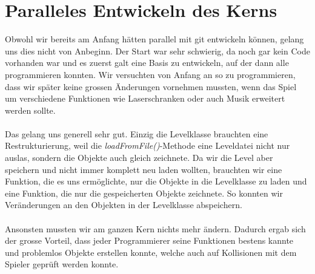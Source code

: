 \documentclass[11pt,a4paper]{scrbook}
\begin{document}
\section{Paralleles Entwickeln des Kerns}
Obwohl wir bereits am Anfang hätten parallel mit git entwickeln können, gelang uns dies nicht von Anbeginn. Der Start war sehr schwierig, da noch gar kein Code vorhanden war
und es zuerst galt eine Basis zu entwickeln, auf der dann alle programmieren konnten. Wir versuchten von Anfang an so zu programmieren,
dass wir später keine grossen Änderungen vornehmen mussten, wenn das Spiel um verschiedene Funktionen wie Laserschranken oder auch Musik erweitert werden sollte.
\\
\\
Das gelang uns generell sehr gut. Einzig die Levelklasse brauchten eine Restrukturierung, weil die \textit{loadFromFile()}-Methode eine Leveldatei nicht nur auslas,
sondern die Objekte auch gleich zeichnete. Da wir die Level aber speichern und nicht immer komplett neu laden wollten, brauchten wir eine
Funktion, die es uns ermöglichte, nur die Objekte in die Levelklasse zu laden und eine Funktion, die nur die gespeicherten Objekte zeichnete. So konnten wir Veränderungen an den Objekten in der Levelklasse abspeichern.
\\
\\
Ansonsten mussten wir am ganzen Kern nichts mehr ändern. Dadurch ergab sich der grosse Vorteil, dass jeder Programmierer seine
Funktionen bestens kannte und problemlos Objekte erstellen konnte, welche auch auf Kollisionen mit dem Spieler geprüft werden konnte.
\end{document}
